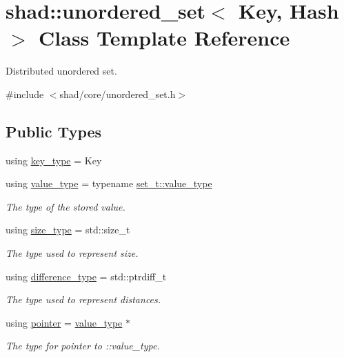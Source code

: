 \hypertarget{classshad_1_1unordered__set}{\section{shad\-:\-:unordered\-\_\-set$<$ Key, Hash $>$ Class Template Reference}
\label{classshad_1_1unordered__set}
}


Distributed unordered set.  




{\ttfamily \#include $<$shad/core/unordered\-\_\-set.\-h$>$}

\subsection*{Public Types}
\begin{DoxyCompactItemize}
\item 
using \hyperlink{group__Types_gae860c65ed861f8aa69b0360638f4ad5d}{key\-\_\-type} = Key
\item 
using \hyperlink{group__Types_ga56832ea0d8218bf22f59a2e8ff4de499}{value\-\_\-type} = typename \hyperlink{classshad_1_1Set_a20c26f02edb7c6c978a0e0b6f2b46c80}{set\-\_\-t\-::value\-\_\-type}
\begin{DoxyCompactList}\small\item\em The type of the stored value. \end{DoxyCompactList}\item 
using \hyperlink{group__Types_gaf733341726e3097cf440257afa76d76a}{size\-\_\-type} = std\-::size\-\_\-t
\begin{DoxyCompactList}\small\item\em The type used to represent size. \end{DoxyCompactList}\item 
using \hyperlink{group__Types_gaa58125290d23043a3bdfa2430291a1e8}{difference\-\_\-type} = std\-::ptrdiff\-\_\-t
\begin{DoxyCompactList}\small\item\em The type used to represent distances. \end{DoxyCompactList}\item 
using \hyperlink{group__Types_ga84503e3a7375cd54f32da739fe21ecc9}{pointer} = \hyperlink{group__Types_ga56832ea0d8218bf22f59a2e8ff4de499}{value\-\_\-type} $\ast$
\begin{DoxyCompactList}\small\item\em The type for pointer to \-::value\-\_\-type. \end{DoxyCompactList}\item 

\end{DoxyCompactItemize}
